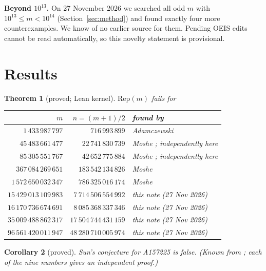 \documentclass[11pt,a4paper]{article}
\newtheorem{theorem}{Theorem}\newtheorem{lemma}[theorem]{Lemma}\newtheorem{corollary}[theorem]{Corollary}
\theoremstyle{definition}\newtheorem{definition}[theorem]{Definition}
\theoremstyle{remark}\newtheorem{remark}[theorem]{Remark}
\newcommand{\Rep}{\mathrm{Rep}}
\begin{document}
\medskip\noindent\textbf{Beyond $10^{13}$.} On 27 November 2026 we searched all odd $m$ with $10^{13}\le m<10^{14}$
(Section~\ref{sec:method}) and found exactly four more counterexamples. We know of no earlier source for them.
Pending OEIS edits cannot be read automatically, so this novelty statement is provisional.

\section{Results}
\begin{theorem}[proved; Lean kernel]\label{thm:main}
$\Rep(m)$ fails for
\begin{center}\begin{tabular}{rrl}\toprule
$m$ & $n=(m+1)/2$ & found by\\\midrule
$1\,433\,987\,797$ & $716\,993\,899$ & Adamczewski \cite{epoch}\\
$45\,483\,661\,477$ & $22\,741\,830\,739$ & Moshe \cite{moshe}; independently here\\
$85\,305\,551\,767$ & $42\,652\,775\,884$ & Moshe \cite{moshe}; independently here\\
$367\,084\,269\,651$ & $183\,542\,134\,826$ & Moshe \cite{moshe}\\
$1\,572\,650\,032\,347$ & $786\,325\,016\,174$ & Moshe \cite{moshe}\\
$15\,429\,013\,109\,983$ & $7\,714\,506\,554\,992$ & this note (27 Nov 2026)\\
$16\,170\,736\,674\,691$ & $8\,085\,368\,337\,346$ & this note (27 Nov 2026)\\
$35\,009\,488\,862\,317$ & $17\,504\,744\,431\,159$ & this note (27 Nov 2026)\\
$96\,561\,420\,011\,947$ & $48\,280\,710\,005\,974$ & this note (27 Nov 2026)\\\bottomrule\end{tabular}\end{center}
\end{theorem}
\begin{corollary}[proved]\label{cor}Sun's conjecture for A157225 is false. (Known from \cite{epoch}; each of the
nine numbers gives an independent proof.)\end{corollary}
\end{document}
